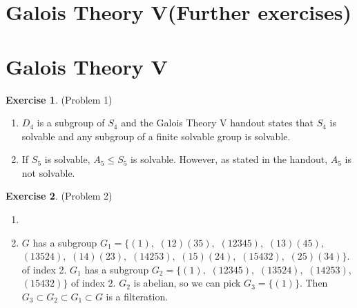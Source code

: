 \documentclass[12pt, psamsfonts]{amsart}
\theoremstyle{definition}
\newtheorem*{exer}{Exercise}
\theoremstyle{remark}
\numberwithin{equation}{section}
\begin{document}
\section{Galois Theory V(Further exercises)}
\section{Galois Theory V}

\begin{exer}{(Problem 1)}
  \begin{enumerate}[label=(\alph*)]
    \item 
      $D_4$ is a subgroup of $S_4$ and the Galois Theory V handout states that $S_4$ is solvable and any subgroup of a finite solvable group is solvable.
    \item
      If $S_5$ is solvable, $A_5 \leq S_5$ is solvable.
      However, as stated in the handout, $A_5$ is not solvable.
  \end{enumerate}
\end{exer}

\begin{exer}{(Problem 2)}
  \begin{enumerate}[label=(\alph*)]
    \item 
      \todo[inline,caption={}]{
      }
    \item
      $G$ has a subgroup $G_1 = \{(1),$ $(12)(35),$ $(12345),$ $(13)(45),$ $(13524),$ $(14)(23),$ $(14253),$ $(15)(24),$ $(15432),$ $(25)(34)\}$.
      of index 2.
      $G_1$ has a subgroup $G_2 = \{(1),$ $(12345),$ $(13524),$ $(14253),$ $(15432)\}$ of index 2.
      $G_2$ is abelian, so we can pick $G_3 = \{(1)\}$.
      Then $G_3 \subset G_2 \subset G_1 \subset G$ is a filteration. 

  \end{enumerate}
\end{exer}
\end{document}

